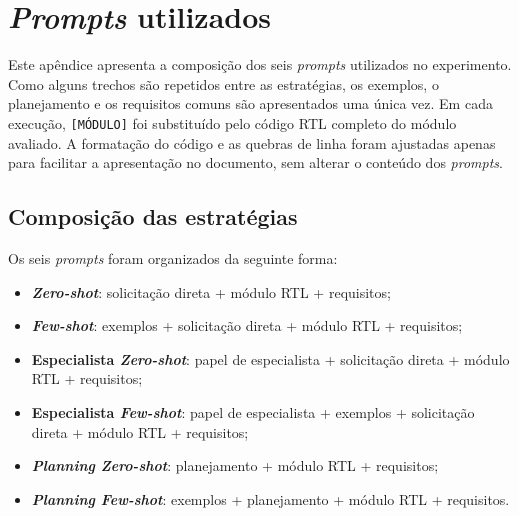 
\section{\textit{Prompts} utilizados}
\label{ap:prompts}

Este apêndice apresenta a composição dos seis \textit{prompts} utilizados no experimento. Como alguns trechos são repetidos entre as estratégias, os exemplos, o planejamento e os requisitos comuns são apresentados uma única vez. Em cada execução, \texttt{[MÓDULO]} foi substituído pelo código RTL completo do módulo avaliado. A formatação do código e as quebras de linha foram ajustadas apenas para facilitar a apresentação no documento, sem alterar o conteúdo dos \textit{prompts}.

\subsection{Composição das estratégias}

Os seis \textit{prompts} foram organizados da seguinte forma:

\begin{itemize}
    \item \textbf{\textit{Zero-shot}}: solicitação direta + módulo RTL + requisitos;

    \item \textbf{\textit{Few-shot}}: exemplos + solicitação direta + módulo RTL + requisitos;

    \item \textbf{Especialista \textit{Zero-shot}}: papel de especialista + solicitação direta + módulo RTL + requisitos;

    \item \textbf{Especialista \textit{Few-shot}}: papel de especialista + exemplos + solicitação direta + módulo RTL + requisitos;

    \item \textbf{\textit{Planning Zero-shot}}: planejamento + módulo RTL + requisitos;

    \item \textbf{\textit{Planning Few-shot}}: exemplos + planejamento + módulo RTL + requisitos.
\end{itemize}


